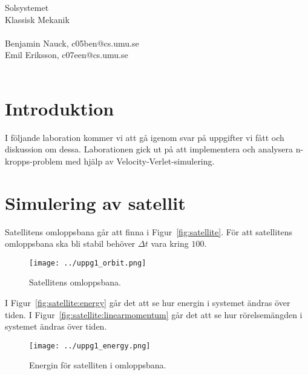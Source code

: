 \documentclass[a4]{article}
\begin{document}
{
\Large
Solsystemet\\
Klassisk Mekanik\\
~\\
Benjamin Nauck, c05ben@cs.umu.se\\
Emil Eriksson, c07een@cs.umu.se\\
~\\
}
\clearpage

\section{Introduktion}
I följande laboration kommer vi att gå igenom svar på uppgifter vi fått och
diskussion om dessa.
Laborationen gick ut på att implementera och analysera n-kropps-problem med
hjälp av Velocity-Verlet-simulering.

\section{Simulering av satellit}
Satellitens omloppsbana går att finna i Figur~\vref{fig:satellite}.
För att satellitens omloppsbana ska bli stabil behöver $\Delta t$ vara kring
$100$.
\begin{figure}
\begin{center}
	\texttt{[image: ../uppg1\_orbit.png]}
\end{center}
\caption{Satellitens omloppsbana.}
\label{fig:satellite}
\end{figure}


I Figur~\vref{fig:satellite:energy} går det att se hur energin i systemet ändras
över tiden.
I Figur~\vref{fig:satellite:linearmomentum} går det att se hur rörelsemängden i
systemet ändras över tiden.

\begin{figure}
\begin{center}
	\texttt{[image: ../uppg1\_energy.png]}
\end{center}
\caption{Energin för satelliten i omloppsbana.}
\label{fig:satellite:energy}
\end{figure}
\end{document}
